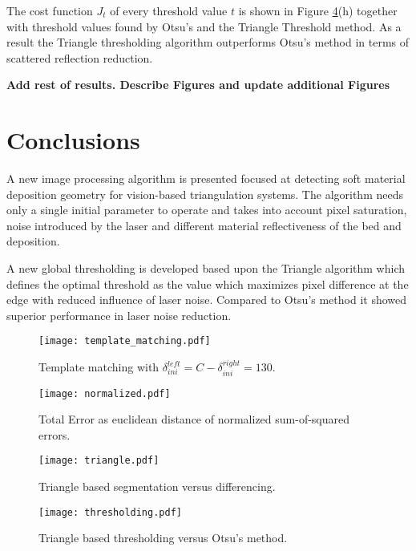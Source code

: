 \documentclass[10pt,letter]{article}
\begin{document}
The cost function $J_t$ of every threshold value $t$ is shown in Figure \ref{fig: thresholding}(h) together with threshold values found by Otsu's and the Triangle Threshold method. As a result the Triangle thresholding algorithm outperforms Otsu's method in terms of scattered reflection reduction.

\textbf{Add rest of results. Describe Figures and update additional Figures}
\section{Conclusions}
A new image processing algorithm is presented focused at detecting soft material deposition geometry for vision-based triangulation systems. The algorithm needs only a single initial parameter to operate and takes into account pixel saturation, noise introduced by the laser and different material reflectiveness of the bed and deposition.

A new global thresholding is developed based upon the Triangle algorithm which defines the optimal threshold as the value which maximizes pixel difference at the edge with reduced influence of laser noise. Compared to Otsu's method it showed superior performance in laser noise reduction.




\begin{figure}[!h]
\centering
\texttt{[image: template\_matching.pdf]} 
\caption{Template matching with $\delta^{left}_{ini}=C-\delta^{right}_{ini}=130$.}
\label{fig: template_matching}
\end{figure} 

\begin{figure}[!h]
\centering
\texttt{[image: normalized.pdf]} 
\caption{Total Error as euclidean distance of normalized sum-of-squared errors.}
\label{fig: normalized}
\end{figure}

\begin{figure}[!h]
\centering
\texttt{[image: triangle.pdf]} 
\caption{Triangle based segmentation versus differencing.}
\label{fig: triangle}
\end{figure}

\begin{figure}[!ht]
\centering
\texttt{[image: thresholding.pdf]} 
\caption{Triangle based thresholding versus Otsu's method.}
\label{fig: thresholding}
\end{figure}
\end{document}
